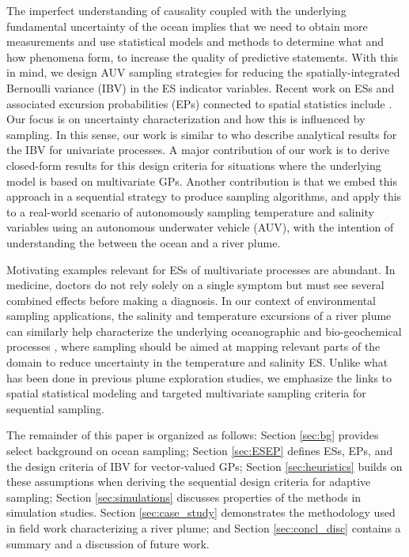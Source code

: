 \documentclass[aoas]{imsart}
\begin{document}
The imperfect understanding of causality coupled with the underlying fundamental uncertainty of the ocean implies that we need to obtain more measurements and use statistical models and methods to determine what and how phenomena form, to increase the quality of predictive statements. With this in mind, we design AUV sampling strategies for reducing the spatially-integrated Bernoulli variance (IBV) in the ES indicator variables. Recent work on ESs and associated excursion probabilities (EPs) connected to spatial statistics include \cite{french2013spatio,bolin2015excursion,french2016credible}. Our focus is on uncertainty characterization and how this is influenced by sampling. In this sense, our work is similar to \cite{bect2012,chevalier2014fast,azzimonti2016quantifying} who describe analytical results for the IBV for univariate processes. A major contribution of our work is to derive closed-form results for this design criteria for situations where the underlying model is based on multivariate GPs. Another contribution is that we embed this approach in a sequential strategy to produce sampling algorithms, and apply this to a real-world scenario of autonomously sampling temperature and salinity variables using an autonomous underwater vehicle (AUV), with the intention of understanding the between the ocean and a river plume. 

Motivating examples relevant for ESs of multivariate processes are abundant. In medicine, doctors do not rely solely on a single symptom but must see several combined effects before making a diagnosis. In our context of environmental sampling applications, the salinity and temperature excursions of a river plume can similarly help characterize the underlying oceanographic and bio-geochemical processes \citep{hopkins2013detection,Pinto2018}, where sampling should be aimed at mapping relevant parts of the domain to reduce uncertainty in the temperature and salinity ES. Unlike what has been done in previous plume exploration studies, we emphasize the links to spatial statistical modeling and targeted multivariate sampling criteria for sequential sampling. 

The remainder of this paper is organized as follows: Section \ref{sec:bg} provides select background on ocean sampling; Section \ref{sec:ESEP} defines ESs, EPs, and the design criteria of IBV for vector-valued GPs; Section \ref{sec:heuristics} builds on these assumptions when deriving the sequential design criteria for adaptive sampling; Section \ref{sec:simulations} discusses properties of the methods in simulation studies. Section \ref{sec:case_study} demonstrates the methodology used in field work characterizing a river plume; and Section \ref{sec:concl_disc} contains a summary and a discussion of future work.
\end{document}
